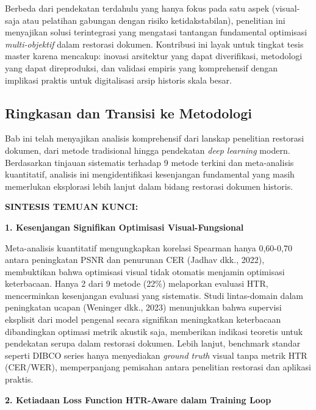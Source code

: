 \documentclass[12pt,a4paper]{article}
\begin{document}
\vspace{0.3em}
Berbeda dari pendekatan terdahulu yang hanya fokus pada satu aspek (visual-saja atau pelatihan gabungan dengan risiko ketidakstabilan), penelitian ini menyajikan solusi terintegrasi yang mengatasi tantangan fundamental optimisasi \textit{multi-objektif} dalam restorasi dokumen. Kontribusi ini layak untuk tingkat tesis master karena mencakup: inovasi arsitektur yang dapat diverifikasi, metodologi yang dapat direproduksi, dan validasi empiris yang komprehensif dengan implikasi praktis untuk digitalisasi arsip historis skala besar.

\subsection{Ringkasan dan Transisi ke Metodologi}
\label{subsec:tinjauan-summary}

Bab ini telah menyajikan analisis komprehensif dari lanskap penelitian restorasi dokumen, dari metode tradisional hingga pendekatan \textit{deep learning} modern. Berdasarkan tinjauan sistematis terhadap 9 metode terkini dan meta-analisis kuantitatif, analisis ini mengidentifikasi kesenjangan fundamental yang masih memerlukan eksplorasi lebih lanjut dalam bidang restorasi dokumen historis.

\vspace{1ex}
\noindent\textbf{SINTESIS TEMUAN KUNCI:}
\vspace{0.5em}

\noindent\textbf{1. Kesenjangan Signifikan Optimisasi Visual-Fungsional}

Meta-analisis kuantitatif mengungkapkan korelasi Spearman hanya 0,60-0,70 antara peningkatan PSNR dan penurunan CER (Jadhav dkk., 2022), membuktikan bahwa optimisasi visual tidak otomatis menjamin optimisasi keterbacaan. Hanya 2 dari 9 metode (22\%) melaporkan evaluasi HTR, mencerminkan kesenjangan evaluasi yang sistematis. Studi lintas-domain dalam peningkatan ucapan (Weninger dkk., 2023) menunjukkan bahwa supervisi eksplisit dari model pengenal secara signifikan meningkatkan keterbacaan dibandingkan optimasi metrik akustik saja, memberikan indikasi teoretis untuk pendekatan serupa dalam restorasi dokumen. Lebih lanjut, benchmark standar seperti DIBCO series hanya menyediakan \textit{ground truth} visual tanpa metrik HTR (CER/WER), memperpanjang pemisahan antara penelitian restorasi dan aplikasi praktis.

\vspace{0.5em}
\noindent\textbf{2. Ketiadaan Loss Function HTR-Aware dalam Training Loop}
\end{document}
